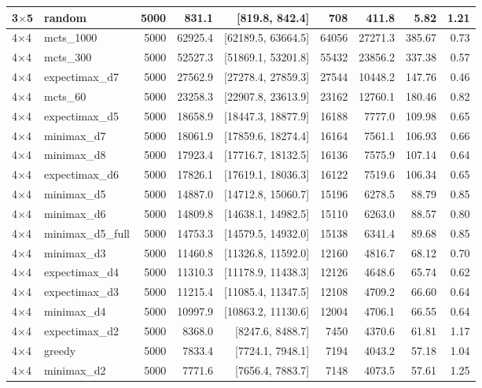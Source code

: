 {\begin{longtable}{llrrrrrrr}
3$\times$5 & random & 5000 & 831.1 & [819.8, 842.4] & 708 & 411.8 & 5.82 & 1.21 \\
\midrule
4$\times$4 & mcts\_1000 & 5000 & 62925.4 & [62189.5, 63664.5] & 64056 & 27271.3 & 385.67 & 0.73 \\
4$\times$4 & mcts\_300 & 5000 & 52527.3 & [51869.1, 53201.8] & 55432 & 23856.2 & 337.38 & 0.57 \\
4$\times$4 & expectimax\_d7 & 5000 & 27562.9 & [27278.4, 27859.3] & 27544 & 10448.2 & 147.76 & 0.46 \\
4$\times$4 & mcts\_60 & 5000 & 23258.3 & [22907.8, 23613.9] & 23162 & 12760.1 & 180.46 & 0.82 \\
4$\times$4 & expectimax\_d5 & 5000 & 18658.9 & [18447.3, 18877.9] & 16188 & 7777.0 & 109.98 & 0.65 \\
4$\times$4 & minimax\_d7 & 5000 & 18061.9 & [17859.6, 18274.4] & 16164 & 7561.1 & 106.93 & 0.66 \\
4$\times$4 & minimax\_d8 & 5000 & 17923.4 & [17716.7, 18132.5] & 16136 & 7575.9 & 107.14 & 0.64 \\
4$\times$4 & expectimax\_d6 & 5000 & 17826.1 & [17619.1, 18036.3] & 16122 & 7519.6 & 106.34 & 0.65 \\
4$\times$4 & minimax\_d5 & 5000 & 14887.0 & [14712.8, 15060.7] & 15196 & 6278.5 & 88.79 & 0.85 \\
4$\times$4 & minimax\_d6 & 5000 & 14809.8 & [14638.1, 14982.5] & 15110 & 6263.0 & 88.57 & 0.80 \\
4$\times$4 & minimax\_d5\_full & 5000 & 14753.3 & [14579.5, 14932.0] & 15138 & 6341.4 & 89.68 & 0.85 \\
4$\times$4 & minimax\_d3 & 5000 & 11460.8 & [11326.8, 11592.0] & 12160 & 4816.7 & 68.12 & 0.70 \\
4$\times$4 & expectimax\_d4 & 5000 & 11310.3 & [11178.9, 11438.3] & 12126 & 4648.6 & 65.74 & 0.62 \\
4$\times$4 & expectimax\_d3 & 5000 & 11215.4 & [11085.4, 11347.5] & 12108 & 4709.2 & 66.60 & 0.64 \\
4$\times$4 & minimax\_d4 & 5000 & 10997.9 & [10863.2, 11130.6] & 12004 & 4706.1 & 66.55 & 0.64 \\
4$\times$4 & expectimax\_d2 & 5000 & 8368.0 & [8247.6, 8488.7] & 7450 & 4370.6 & 61.81 & 1.17 \\
4$\times$4 & greedy & 5000 & 7833.4 & [7724.1, 7948.1] & 7194 & 4043.2 & 57.18 & 1.04 \\
4$\times$4 & minimax\_d2 & 5000 & 7771.6 & [7656.4, 7883.7] & 7148 & 4073.5 & 57.61 & 1.25 \\

\end{longtable}}
